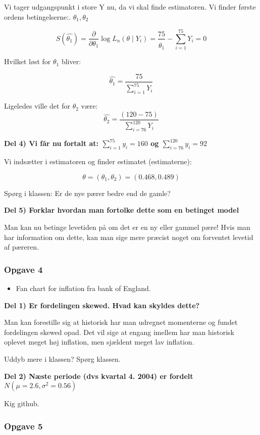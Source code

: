 Vi tager udgangspunkt i store Y nu, da vi skal finde estimatoren. Vi finder første ordens betingelserne:. $\theta_1, \theta_2$

\begin{equation}
    S(\hat{\theta_1}) = \frac{\partial}{\partial \theta_1} \log L_n (\theta \mid Y_i) = \frac{75}{\hat{\theta_1}} - \sum_{i=1}^{75} Y_i = 0
\end{equation}

Hvilket løst for $\theta_1$ bliver:

\begin{equation}
\hat{\theta_1} = \frac{75}{\sum_{i=1}^{75} Y_i }
\end{equation}

Ligeledes ville det for $\theta_2$ være:
\begin{equation}
\hat{\theta_2} = \frac{(120 - 75)}{\sum_{i=76}^{120} Y_i }
\end{equation}

\textbf{Del 4) Vi får nu fortalt at: $\sum_{i=1}^{75}  y_i = 160$ og $\sum_{i=76}^{120}  y_i = 92$}


Vi indsætter i estimatoren og finder estimatet (estimaterne):

\begin{equation}
    \theta = ( \theta_1, \theta_2) = (0.468, 0.489)
\end{equation}

Spørg i klassen: Er de nye pærer bedre end de gamle?

\textbf{Del 5) Forklar hvordan man fortolke dette som en betinget model}

Man kan nu betinge levetiden på om det er en ny eller gammel pære! Hvis man har information om dette, kan man sige mere præcist noget om forventet levetid af pæreren.

\subsubsection{Opgave 4}

\begin{itemize}
    \item Fan chart for inflation fra bank of England.
\end{itemize}

\textbf{Del 1) Er fordelingen skewed. Hvad kan skyldes dette?}

Man kan forestille sig at historisk har man udregnet momenterne og fundet fordelingen skewed opad. Det vil sige at  engang imellem har man historisk oplevet meget høj inflation, men sjældent meget lav inflation.

Uddyb mere i klassen? Spørg klassen.

\textbf{Del 2) Næste periode (dvs kvartal 4. 2004) er fordelt $N(\mu = 2.6, \sigma^2 = 0.56)$}

Kig github.
\subsubsection{Opgave 5}
